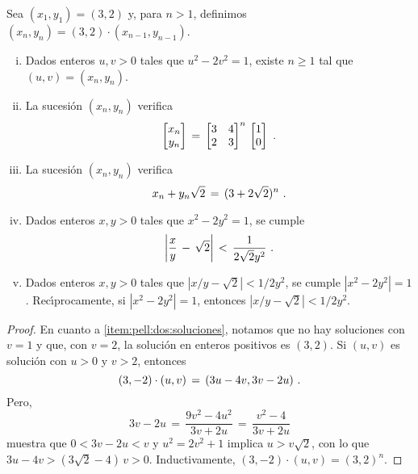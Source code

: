 \begin{teoPell}\label{teo:pell:dos}
	Sea $(x_1,y_1)=(3,2)$ y, para $n>1$, definimos
	$(x_n,y_n)=(3,2)\cdot (x_{n-1},y_{n-1})$.
	\begin{enumerate}[(i)]
		\item\label{item:pell:dos:soluciones}
			Dados enteros $u,v>0$ tales que
			$u^2-2v^2=1$, existe $n\geq 1$ tal que
			$(u,v)=(x_n,y_n)$.
		\item\label{item:pell:dos:matricial}
			La sucesi\'on $(x_n,y_n)$ verifica
			\begin{displaymath}
				\begin{bmatrix}
					x_n \\ y_n
				\end{bmatrix}\,=\,
				\begin{bmatrix}
					3 & 4 \\ 2 & 3
				\end{bmatrix}^n\,
				\begin{bmatrix} 1 \\ 0 \end{bmatrix}
				\text{ .}
			\end{displaymath}
		\item\label{item:pell:dos:cuadratico}
			La sucesi\'on $(x_n,y_n)$ verifica
			\begin{displaymath}
				x_n+y_n\sqrt 2\,=\,
					(3+2\sqrt 2)^n
				\text{ .}
			\end{displaymath}
		\item\label{item:pell:dos:aproxima}
			Dados enteros $x,y>0$ tales que $x^2-2y^2=1$,
			se cumple
			\begin{displaymath}
				\left|\frac x y\,-\,\sqrt 2\right|\,<\,
					\frac 1{2\sqrt 2 y^2}
				\text{ .}
			\end{displaymath}
		\item\label{item:pell:dos:aproxima:reciproca}
			Dados enteros $x,y>0$ tales que $|x/y-\sqrt 2|<1/2y^2$,
			se cumple $|x^2-2y^2|=1$. Rec\'{\i}procamente,
			si $|x^2-2y^2|=1$, entonces $|x/y-\sqrt 2|<1/2y^2$.
	\end{enumerate}
\end{teoPell}

\begin{proof}
	En cuanto a \eqref{item:pell:dos:soluciones},
	notamos que no hay soluciones con $v=1$ y que, con $v=2$,
	la soluci\'on en enteros positivos es $(3,2)$. Si $(u,v)$ es
	soluci\'on con $u>0$ y $v>2$, entonces
	\begin{displaymath}
		(3,-2)\cdot (u,v)\,=\,(3u-4v,3v-2u)
		\text{ .}
	\end{displaymath}
	Pero,
	\begin{displaymath}
		3v-2u\,=\,\frac{9v^2-4u^2}{3v+2u}\,=\,
			\frac{v^2-4}{3v+2u}
	\end{displaymath}
	muestra que $0<3v-2u<v$ y $u^2=2v^2+1$ implica
	$u>v\sqrt 2$, con lo que $3u-4v>(3\sqrt 2-4)\,v>0$.
	Inductivamente, $(3,-2)\cdot(u,v)=(3,2)^n$.
\end{proof}

